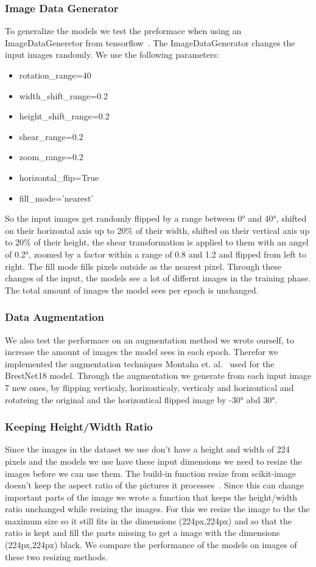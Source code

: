\documentclass[sn-mathphys,Numbered]{sn-jnl}%
\theoremstyle{thmstyleone}%
\theoremstyle{thmstyletwo}%
\theoremstyle{thmstylethree}%
\begin{document}
\subsubsection{Image Data Generator}\label{ImageDataGenerator}
To generalize the models we test the preformace when using an ImageDataGeneretor from tensorflow~\cite{IDG}. The ImageDataGenerator changes the input images randomly. We use the following parameters:\\
\begin{itemize}
\item rotation\_range=40
\item width\_shift\_range=0.2
\item height\_shift\_range=0.2
\item shear\_range=0.2
\item zoom\_range=0.2
\item horizontal\_flip=True
\item fill\_mode='nearest'
\end{itemize}
So the input images get randomly flipped by a range between 0° and 40°, shifted on their horizontal axis up to 20\% of their width, shifted on their vertical axis up to 20\% of their height, the shear transformation is applied to them with an angel of 0.2°, zoomed by a factor within a range of 0.8 and 1.2 and flipped from left to right. The fill mode fills pixels outside as the nearest pixel. Through these changes of the input, the models see a lot of differnt images in the training phase. The total amount of images the model sees per epoch is unchanged.
\subsubsection{Data Augmentation}\label{DataAugmentation}
We also test the performace on an augmentation method we wrote ourself, to increase the amount of images the model sees in each epoch. Therefor we implemented the augmentation techniques Montaha et. al.~\cite{Montaha2021} used for the BrestNet18 model. Through the augmentation we generate from each input image 7 new ones, by flipping verticaly, horizonticaly, verticaly and horizontical and rotateing the original and the horizontical flipped image by -30° abd 30°.
\subsubsection{Keeping Height/Width Ratio}\label{HeightWidth}
Since the images in the dataset we use don't have a height and width of 224 pixels and the models we use have these input dimensions we need to resize the images before we can use them. The build-in function resize from scikit-image doesn't keep the aspect ratio of the pictures it processes~\cite{resize}. Since this can change important parts of the image we wrote a function that keeps the height/width ratio unchanged while resizing the images. For this we resize the image to the the maximum size so it still fits in the dimensions (224px,224px) and so that the ratio is kept and fill the parts missing to get a image with the dimensions (224px,224px) black. We compare the performance of the models on images of these two resizing methods.\\
\end{document}
